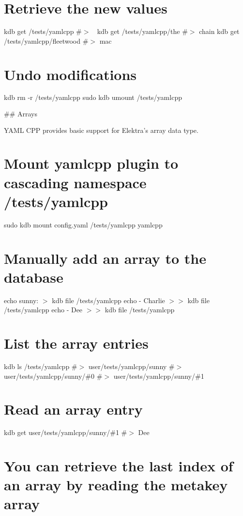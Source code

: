 \section*{Retrieve the new values}

kdb get /tests/yamlcpp \#$>$ 🎵 kdb get /tests/yamlcpp/the \#$>$ chain kdb get /tests/yamlcpp/fleetwood \#$>$ mac

\section*{Undo modifications}

kdb rm -\/r /tests/yamlcpp sudo kdb umount /tests/yamlcpp 
\begin{DoxyCode}
## Arrays

YAML CPP provides basic support for Elektra’s array data type.
\end{DoxyCode}
 \section*{Mount yamlcpp plugin to cascading namespace {\ttfamily /tests/yamlcpp}}

sudo kdb mount config.\+yaml /tests/yamlcpp yamlcpp

\section*{Manually add an array to the database}

echo \textquotesingle{}sunny\+:\textquotesingle{} $>$ {\ttfamily kdb file /tests/yamlcpp} echo \textquotesingle{} -\/ Charlie\textquotesingle{} $>$$>$ {\ttfamily kdb file /tests/yamlcpp} echo \textquotesingle{} -\/ Dee\textquotesingle{} $>$$>$ {\ttfamily kdb file /tests/yamlcpp}

\section*{List the array entries}

kdb ls /tests/yamlcpp \#$>$ user/tests/yamlcpp/sunny \#$>$ user/tests/yamlcpp/sunny/\#0 \#$>$ user/tests/yamlcpp/sunny/\#1

\section*{Read an array entry}

kdb get user/tests/yamlcpp/sunny/\#1 \#$>$ Dee

\section*{You can retrieve the last index of an array by reading the metakey {\ttfamily array}}

